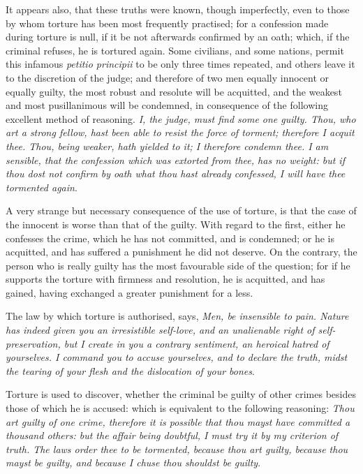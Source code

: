 It appears also, that these truths were known, though imperfectly,
even to those by whom torture has been most frequently practised; for
a confession made during torture is null, if it be not afterwards
confirmed by an oath; which, if the criminal refuses, he is tortured
again. Some civilians, and some nations, permit this infamous
\textit{petitio principii} to be only three times repeated, and others
leave it to the discretion of the judge; and therefore of two men
equally innocent or equally guilty, the most robust and resolute will
be acquitted, and the weakest and most pusillanimous will be
condemned, in consequence of the following excellent method of
reasoning. \textit{I, the judge, must find some one guilty. Thou, who
art a strong fellow, hast been able to resist the force of torment;
therefore I acquit thee. Thou, being weaker, hath yielded to it; I
therefore condemn thee. I am sensible, that the confession which was
extorted from thee, has no weight: but if thou dost not confirm by
oath what thou hast already confessed, I will have thee tormented
again}.

A very strange but necessary consequence of the use of torture, is
that the case of the innocent is worse than that of the guilty. With
regard to  the first, either he confesses the crime, which he
has not committed, and is condemned; or he is acquitted, and has
suffered a punishment he did not deserve. On the contrary, the person
who is really guilty has the most favourable side of the question; for
if he supports the torture with firmness and resolution, he is
acquitted, and has gained, having exchanged a greater punishment for a
less.

The law by which torture is authorised, says, \textit{Men, be
insensible to pain. Nature has indeed given you an irresistible
self-love, and an unalienable right of self-preservation, but I create
in you a contrary sentiment, an heroical hatred of yourselves. I
command you to accuse yourselves, and to declare the truth, midst the
tearing of your flesh and the dislocation of your bones}.

Torture is used to discover, whether the criminal be guilty of other
crimes besides those of which he is accused: which is equivalent to
the following reasoning: \textit{Thou art guilty of one crime,
therefore it is possible that thou mayst have committed a thousand
others: but the affair being doubtful, I must try it by my criterion
of truth. The laws order thee to be tormented, because thou art
guilty, because thou mayst be guilty, and because I chuse thou
shouldst be guilty}.

